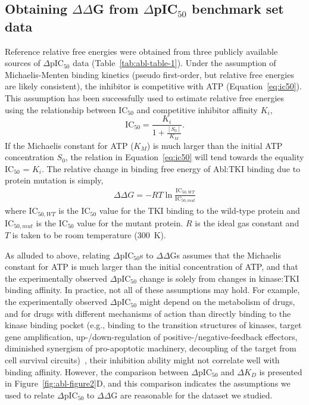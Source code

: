 \documentclass[phd,tocprelim]{cornell}
\begin{document}
\subsection{Obtaining $\Delta\Delta$G from $\Delta$pIC$_{50}$ benchmark set data}
Reference relative free energies were obtained from three publicly available sources of $\Delta$pIC$_{50}$ data (Table~\ref{tab:abl-table-1}).
Under the assumption of Michaelis-Menten binding kinetics (pseudo first-order, but relative free energies are likely consistent), the inhibitor is competitive with ATP (Equation~\ref{eq:ic50}). 
This assumption has been successfully used to estimate relative free energies~\citep{Price:Bioorg.Med.Chem.Lett.:2000,Luccarelli:J.Chem.TheoryComput.:2010,Michel:J.Med.Chem.:2006,mondal2016} using the relationship between IC$_{50}$ and competitive inhibitor affinity $K_{i}$,
\begin{equation}
\label{eq:ic50}
\mathrm{IC}_{50} = \frac{ K_{i} }{ 1 + \frac{[S_{0}]}{K_{M}} } .
\end{equation}
If the Michaelis constant for ATP ($K_{M}$) is much larger than the initial ATP concentration $S_{0}$, the relation in Equation~\ref{eq:ic50} will tend towards the equality IC$_{50}$ = $K_{i}$. The relative change in binding free energy of Abl:TKI binding due to protein mutation is simply,
\begin{eqnarray}
\Delta\Delta G = - RT \ln \frac{\mathrm{IC}_{50,WT}}{\mathrm{IC}_{50,mut}} \label{eq:ddg}
\end{eqnarray}
where IC$_{50,WT}$ is the IC$_{50}$ value for the TKI binding to the wild-type protein and IC$_{50,mut}$ is the IC$_{50}$ value for the mutant protein. 
$R$ is the ideal gas constant and $T$ is taken to be room temperature (300~K).

As alluded to above, relating $\Delta$pIC$_{50}$s to $\Delta\Delta$Gs assumes that the Michaelis constant for ATP is much larger than the initial concentration of ATP, and that the experimentally observed $\Delta$pIC$_{50}$ change is solely from changes in kinase:TKI binding affinity. In practice, not all of these assumptions may hold. 
For example, the experimentally observed $\Delta$pIC$_{50}$ might depend on the metabolism of drugs, and for drugs with different mechanisms of action than directly binding to the kinase binding pocket (e.g., binding to the transition structures of kinases, target gene amplification, up-/down-regulation of positive-/negative-feedback effectors, diminished synergism of pro-apoptotic machinery, decoupling of the target from cell survival circuits)~\citep{BarouchBentov:2011dx,McDermott:2007kq},
their inhibition ability might not correlate well with binding affinity. 
However, the comparison between $\Delta$pIC$_{50}$ and $\Delta K_{D}$ is presented in Figure~\ref{fig:abl-figure2}D, and this comparison indicates the assumptions we used to relate $\Delta$pIC$_{50}$ to $\Delta\Delta$G are reasonable for the dataset we studied.
\end{document}
